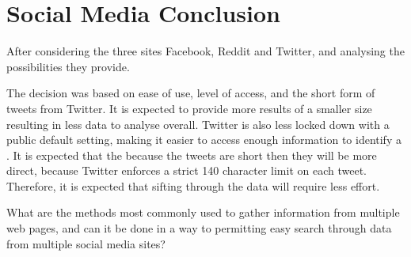 \section{Social Media Conclusion}\label{sec:social-media-conclusion}
After considering the three sites Facebook, Reddit and Twitter, and
analysing the possibilities they provide.\nl


The decision was based on ease of use, level of access, and the short form of
tweets from Twitter. It is expected to provide more results of a smaller size
resulting in less data to analyse overall. Twitter is also less locked down with
a public default setting, making it easier to access enough information to
identify a \fb. It is expected that the because the tweets are short then they
will be more direct, because Twitter enforces a strict 140 character limit on each
tweet. Therefore, it is expected that sifting through the data will require less
effort.\nl

What are the methods most commonly used to gather information from multiple web
pages, and can it be done in a way to permitting easy search through data from
multiple social media sites?
